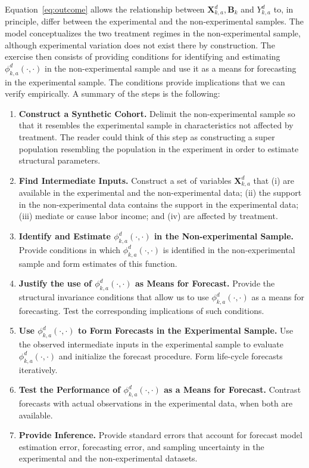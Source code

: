 \noindent Equation~\eqref{eq:outcome} allows the relationship between $\bm{X}^d_{k,a}, \bm{B}_k$ and $Y^d_{k,a}$ to, in principle, differ between the experimental and the non-experimental samples. The model conceptualizes the two treatment regimes in the non-experimental sample, although experimental variation does not exist there by construction. The exercise then consists of providing conditions for identifying and estimating $\phi^d_{k,a}\left( \cdot, \cdot \right)$ in the non-experimental sample and use it as a means for forecasting in the experimental sample. The conditions provide implications that we can verify empirically. A summary of the steps is the following: 

\begin{enumerate}
\item \textbf{Construct a Synthetic Cohort.} Delimit the non-experimental sample so that it resembles the experimental sample in characteristics not affected by treatment. The reader could think of this step as constructing a super population resembling the population in the experiment in order to estimate structural parameters.
\item \textbf{Find Intermediate Inputs.} Construct a set of variables $\bm{X}^d_{k,a}$ that (i) are available in the experimental and the non-experimental data; (ii) the support in the non-experimental data contains the support in the experimental data; (iii) mediate or cause labor income; and (iv) are affected by treatment.
\item \textbf{Identify and Estimate $\phi^d_{k,a}\left( \cdot, \cdot \right)$ in the Non-experimental Sample.} Provide conditions in which $\phi^d_{k,a}\left( \cdot, \cdot \right)$ is identified in the non-experimental sample and form estimates of this function.
\item \textbf{Justify the use of  $\phi^d_{k,a}\left( \cdot, \cdot \right)$ as Means for Forecast.} Provide the structural invariance conditions that allow us to use $\phi^d_{k,a}\left( \cdot, \cdot \right)$ as a means for forecasting. Test the corresponding implications of such conditions.
\item \textbf{Use $\phi^d_{k,a}\left( \cdot, \cdot \right)$ to Form Forecasts in the Experimental Sample.} Use the observed intermediate inputs in the experimental sample to evaluate $\phi^d_{k,a}\left( \cdot, \cdot \right)$ and initialize the forecast procedure. Form life-cycle forecasts iteratively. 
\item \textbf{Test the Performance of $\phi^d_{k,a}\left( \cdot, \cdot \right)$  as a Means for Forecast.} Contrast forecasts with actual observations in the experimental data, when both are available.
\item \textbf{Provide Inference.} Provide standard errors that account for forecast model estimation error, forecasting error, and sampling uncertainty in the experimental and the non-experimental datasets. 
\end{enumerate}

